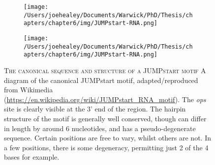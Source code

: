 \begin{figure}[h]
\centering
  \begin{subfigure}{0.49\textwidth}
    \texttt{[image: /Users/joehealey/Documents/Warwick/PhD/Thesis/chapters/chapter6/img/JUMPstart-RNA.png]}
  \end{subfigure}
  \begin{subfigure}{0.49\textwidth}
    \texttt{[image: /Users/joehealey/Documents/Warwick/PhD/Thesis/chapters/chapter6/img/JUMPstart-RNA.png]}
  \end{subfigure}
  
    \captionsetup{singlelinecheck=off, justification=justified, font=footnotesize, aboveskip=10pt}
    \caption[The canoncial semi-degenerate JUMPstart motif]{\textsc{\normalsize The canonical sequence and structure of a JUMPstart motif} \vspace{0.1cm} \newline A diagram of the canonical JUMPstart motif, adapted/reproduced from Wikimedia (\url{https://en.wikipedia.org/wiki/JUMPstart_RNA_motif}). The \emph{ops} site is clearly visible at the 3' end of the region. The hairpin structure of the motif is generally well conserved, though can differ in length by around 6 nucleotides, and has a pseudo-degenerate sequence. Certain positions are free to vary, whilst others are not. In a few positions, there is some degeneracy, permitting just 2 of the 4 bases for example.}
\label{canonicaljs}
\end{figure}


%
%
%
%
%
%
%



